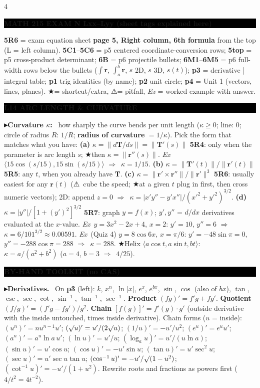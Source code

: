 \documentclass{article}
\newcommand\bodysize{3.55}      %
\newcommand\bodylead{3.774}     %
\newcommand\vb[1]{\symbf{#1}}                 %
\newcommand\nm[1]{\lVert #1\rVert}            %
\newcommand\ip[1]{\langle #1\rangle}          %
\newcommand\sh[1]{{\setlength\fboxsep{0.18pt}\colorbox{black!22}{\textbf{#1}}}} %
\newcommand\hd[1]{\par\vspace{0.5pt}\needspace{4\baselineskip}\noindent
  {\setlength\fboxsep{0.45pt}\colorbox{black}{\parbox{\dimexpr\linewidth-2\fboxsep}{\color{white}\bfseries #1}}}\par\nobreak\vspace{0.2pt}\nobreak}
\newcommand\pt[1]{\par\textbf{{\symf ▸}#1}\ }  %
\newcommand\ex{\textit{Ex}\ }                  %
\newcommand\warn{{\symf ⚠}}                    %
\newcommand\shc{{\symf ★}}                      %
\newcommand\rt{\smash{\surd}}               %
\newcommand\then{\ensuremath{\Rightarrow}}
\begin{document}
\fontsize{\bodysize}{\bodylead}\selectfont
\begin{multicols*}{4}

\hd{MATH 215 EXAM N \quad Lxx–Lyy \quad (sheet tags explained here)}
\sh{5R6} = exam equation sheet \textbf{page 5, Right column, 6th formula} from the top (L = left column). \sh{5C1}–\sh{5C6} = p5 centered coordinate-conversion rows; \sh{5top} = p5 cross-product determinant; \sh{6B} = p6 projectile bullets; \sh{6M1}–\sh{6M5} = p6 full-width rows below the bullets ($\int\vb r$, $\int_a^b\vb r$, $s$ 2D, $s$ 3D, $s(t)$); \sh{p3} = derivative | integral table; \sh{p1} trig identities (by name); \sh{p2} unit circle; \sh{p4} = Unit 1 (vectors, lines, planes). \shc = shortcut/extra, \warn = pitfall, \textit{Ex} = worked example with answer.

\hd{L14 ARC LENGTH \& CURVATURE}
\pt{Curvature $\kappa$:} how sharply the curve bends per unit length ($\kappa\ge0$; line: 0; circle of radius $R$: $1/R$; \textbf{radius of curvature} $=1/\kappa$). Pick the form that matches what you have: \textbf{(a)} $\kappa=\nm{d\vb T/ds}=\nm{\vb T'(s)}$ \sh{5R4}: only when the parameter is arc length $s$; \shc then $\kappa=\nm{\vb r''(s)}$. \ex $\ip{15\cos(s/15),15\sin(s/15)}$ \then\ $\kappa=1/15$. \textbf{(b)} $\kappa=\nm{\vb T'(t)}/\nm{\vb r'(t)}$ \sh{5R5}: any $t$, when you already have $\vb T$. \textbf{(c)} $\kappa=\nm{\vb r'\times\vb r''}/\nm{\vb r'}^3$ \sh{5R6}: usually easiest for any $\vb r(t)$ (\warn\ cube the speed; \shc at a given $t$ plug in first, then cross numeric vectors); 2D: append $z=0$ \then\ $\kappa=|x'y''-y'x''|/(x'^2+y'^2)^{3/2}$. \textbf{(d)} $\kappa=|y''|/[1+(y')^2]^{3/2}$ \sh{5R7}: graph $y=f(x)$; $y',y''$ = $d/dx$ derivatives evaluated at the $x$-value. \ex $y=3x^2-2x+4$, $x=2$: $y'=10$, $y''=6$ \then\ $\kappa=6/101^{3/2}\approx0.00591$. \ex (Quiz 4) $y=8\cos6x$, $x=\pi/6$: $y'=-48\sin\pi=0$, $y''=-288\cos\pi=288$ \then\ $\kappa=288$. \shc Helix $\ip{a\cos t,a\sin t,bt}$: $\kappa=a/(a^2+b^2)$ ($a=4$, $b=3$ \then\ $4/25$).

\hd{BY-HAND TOOLKIT (no CAS)}
\pt{Derivatives.} On \sh{p3} (left): $k$, $x^n$, $\ln|x|$, $e^x$, $e^{bx}$, $\sin$, $\cos$ (also of $bx$), $\tan$, $\csc$, $\sec$, $\cot$, $\sin^{-1}$, $\tan^{-1}$, $\sec^{-1}$. \textbf{Product} $(fg)'=f'g+fg'$. \textbf{Quotient} $(f/g)'=(f'g-fg')/g^2$. \textbf{Chain} $[f(g)]'=f'(g)\cdot g'$ (outside derivative with the inside untouched, times inside derivative). Chain forms ($u$ = inside): $(u^n)'=nu^{n-1}u'$; $(\rt u)'=u'/(2\rt u)$; $(1/u)'=-u'/u^2$; $(e^u)'=e^uu'$; $(a^u)'=a^u\ln a\,u'$; $(\ln u)'=u'/u$; $(\log_au)'=u'/(u\ln a)$; $(\sin u)'=u'\cos u$; $(\cos u)'=-u'\sin u$; $(\tan u)'=u'\sec^2u$; $(\sec u)'=u'\sec u\tan u$; $(\cos^{-1}u)'=-u'/\rt(1-u^2)$; $(\cot^{-1}u)'=-u'/(1+u^2)$. Rewrite roots and fractions as powers first ($4/t^2=4t^{-2}$).


\end{multicols*}
\end{document}
